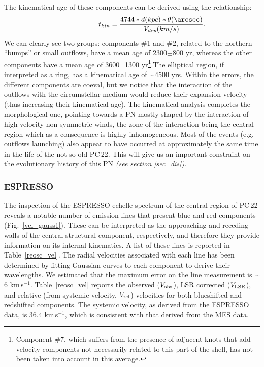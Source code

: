 \documentclass[fleqn,usenatbib,useAMS]{mnras}
\begin{document}
The kinematical age of these components can be derived using the
relationship: 
\begin{equation}
\hspace{2cm} t_{kin}= \frac{4744 * d (kpc) * \theta (\arcsec)}{V_{dep} (km/s)}.
\end{equation}
We can clearly see two groups: 
components \#1 and \#2, related to the northern ``bumps'' or small
outflows, have a mean age of 2300$\pm$800 yr, whereas the other
components have a mean age of 3600$\pm$1300 yr\footnote{
Component \#7, which suffers from the presence of adjacent knots that
add velocity components not necessarily related to this part of the
shell, has not been taken into account in this average.
}.The elliptical region, if interpreted as a ring, has a kinematical age of $\sim$4500 yrs. Within the errors, the different components are coeval, but we notice
that the interaction of the outflows with the circumstellar medium would reduce their
expansion velocity (thus increasing their kinematical age).
The kinematical analysis completes the morphological one, pointing towards
a PN mostly shaped by the interaction of high-velocity non-symmetric winds,
the zone of the interaction being the central region which as a consequence
is highly inhomogeneous.
Most of the events (e.g. outflows launching) also appear to have occurred
at approximately the same time in the life of the not so old PC\,22.
This will give us an important constraint on the evolutionary history of this PN {\it (see section \ref{sec_dis})}.


\subsubsection{ESPRESSO}\label{res_REOSC}


The inspection of the ESPRESSO echelle spectrum of the central region of
PC\,22 reveals a notable number of emission lines that present blue and
red components (Fig.~\ref{vel_gauss1}).
These can be interpreted as the approaching and receding walls of the
central structural component, respectively, and therefore they provide
information on its internal kinematics.
A list of these lines is reported in Table~\ref{reosc_vel}.
The radial velocities associated with each line has been determined by
fitting Gaussian curves to each component to derive their wavelengths.
We estimated that the maximum error on the line measurement is
$\sim$6 km\,s$^{-1}$.
Table~\ref{reosc_vel} reports the observed ($V_{\rm obs}$), LSR corrected ($V_{\rm LSR}$),
and relative (from systemic velocity, $V_{\rm rel}$) velocities for both
blueshifted and redshifted components.
The systemic velocity, as derived from the ESPRESSO data, is 36.4 km\,s$^{-1}$,
which is consistent with that derived from the MES data. 
\end{document}
